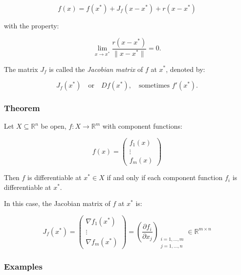 \documentclass{article}
\begin{document}
\[
f(x) = f(x^*) + J_f(x - x^*) + r(x - x^*)
\]

with the property:

\[
\lim_{x \to x^*} \frac{r(x - x^*)}{\|x - x^*\|} = 0.
\]

The matrix \( J_f \) is called the \textit{Jacobian matrix} of \( f \) at \( x^* \), denoted by:

\[
J_f(x^*) \quad \text{or} \quad Df(x^*), \quad \text{sometimes } f'(x^*).
\]

\subsubsection{Theorem}

Let \( X \subseteq \mathbb{R}^n \) be open, \( f: X \rightarrow \mathbb{R}^m \) with component functions:

\[
f(x) = 
\begin{pmatrix}
f_1(x) \\
\vdots \\
f_m(x)
\end{pmatrix}
\]

Then \( f \) is differentiable at \( x^* \in X \) if and only if each component function \( f_i \) is differentiable at \( x^* \).

In this case, the Jacobian matrix of \( f \) at \( x^* \) is:

\[
J_f(x^*) = 
\begin{pmatrix}
\nabla f_1(x^*) \\
\vdots \\
\nabla f_m(x^*)
\end{pmatrix}
= 
\left( \frac{\partial f_i}{\partial x_j} \right)_{\substack{i=1,\ldots,m \\ j=1,\ldots,n}}
\in \mathbb{R}^{m \times n}
\]

\subsubsection*{Examples}
\end{document}
